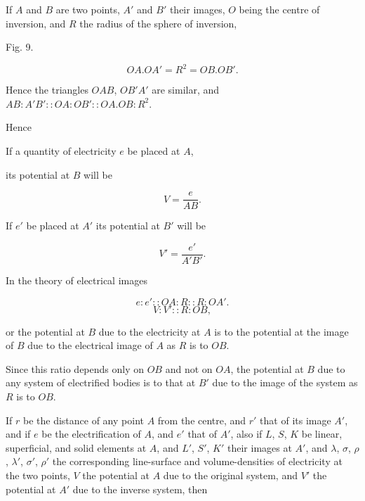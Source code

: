 \documentclass[11pt,a4paper]{article}
\begin{document}
If $A$ and $B$ are two points, $A'$ and $B'$ their images, $O$ being
the centre of inversion, and $R$ the radius of the sphere of inversion,

\begin{center}

Fig. 9.
\end{center}

\[
OA.OA' = R^2 = OB.OB'.
\]

Hence the triangles $OAB$, $OB'A'$ are similar, and
$AB:A'B'::OA:OB'::OA.OB:R^2$.

Hence

If a quantity of electricity $e$ be placed at $A$,

its potential at $B$ will be

\[
V = \frac{e}{AB}.
\]

If $e'$ be placed at $A'$ its potential at $B'$ will be

\[
V' = \frac{e'}{A'B'}.
\]

In the theory of electrical images

\[
e : e' :: OA : R :: R : OA'.
\]
\begin{equation}\tag{17}
V:V'::R:OB,
\end{equation}

or the potential at $B$ due to the electricity at $A$ is to the
potential at the image of $B$ due to the electrical image of $A$ as
$R$ is to $OB$.

Since this ratio depends only on $OB$ and not on $OA$, the potential
at $B$ due to any system of electrified bodies is to that at $B'$ due
to the image of the system as $R$ is to $OB$.

If $r$ be the distance of any point $A$ from the centre, and $r'$ that
of its image $A'$, and if $e$ be the electrification of $A$, and $e'$
that of $A'$, also if $L$, $S$, $K$ be linear, superficial, and solid
elements at $A$, and $L'$, $S'$, $K'$ their images at $A'$, and
$\lambda$, $\sigma$, $\rho$, $\lambda'$, $\sigma'$, $\rho'$ the
corresponding line-surface and volume-densities of electricity at the
two points, $V$ the potential at $A$ due to the original system, and
$V'$ the potential at $A'$ due to the inverse system, then
\end{document}
